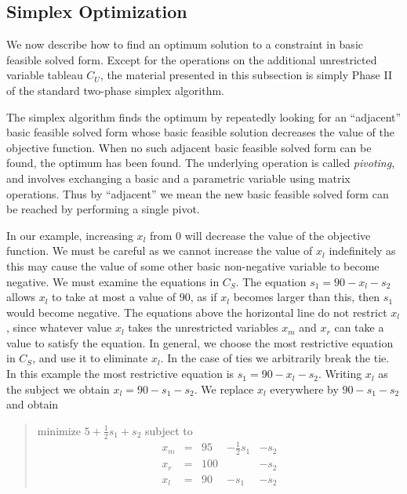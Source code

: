 \documentclass{article}
\begin{document}
\subsection{Simplex Optimization}
\label{simplex-optimization}

We now describe how to find an optimum solution to a constraint in basic
feasible solved form.  Except for the operations on the additional
unrestricted variable tableau $C_U$, the material presented in this
subsection is simply Phase II of the standard two-phase simplex algorithm.

The simplex algorithm finds the optimum by repeatedly looking for an
``adjacent'' basic feasible solved form whose basic feasible solution
decreases the value of the objective function.  When no such adjacent basic
feasible solved form can be found, the optimum has been found.  The
underlying operation is called {\em pivoting}, and involves exchanging a
basic and a parametric variable using matrix operations.  Thus by
``adjacent'' we mean the new basic feasible solved form can be reached by
performing a single pivot.

In our example, increasing $x_l$ from $0$ will decrease the value of the
objective function.  We must be careful as we cannot increase the value of
$x_l$ indefinitely as this may cause the value of some other
basic non-negative variable to become negative.  We must examine the
equations in $C_S$\@.  The equation $s_1 = 90 - x_l - s_2$ allows $x_l$ to
take at most a value of $90$, as if $x_l$ becomes larger than this, then
$s_1$ would become negative.  The equations above the horizontal line do not
restrict $x_l$, since whatever value $x_l$ takes the unrestricted variables
$x_m$ and $x_r$ can take a value to satisfy the equation.  In general,
we choose the most restrictive equation in $C_S$, and use it to eliminate
$x_l$.  In the case of ties we arbitrarily break the tie. In this example
the most restrictive equation is $s_1 = 90 - x_l - s_2$.  Writing $x_l$ as
the subject we obtain $x_l = 90 - s_1 - s_2$.  We replace $x_l$ everywhere
by $90 - s_1 - s_2$ and obtain
\begin{quote}\vspace*{-1ex}
minimize $5 + \frac{1}{2} s_1 + s_2$ 
subject to 
$$
\begin{array}{rlrrr} 
x_m & = &95 & - \frac{1}{2} s_1 & - s_2 \\
x_r & = &100 &  & - s_2 \\ \hline
x_l & = &90 & - s_1 & - s_2 
\end{array}
$$
\end{quote}\vspace{-0.9ex}
\end{document}
